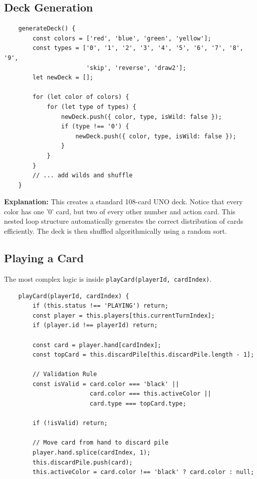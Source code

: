 \documentclass[11pt,a4paper]{article}
\begin{document}
\subsection{Deck Generation}
\begin{verbatim}
    generateDeck() {
        const colors = ['red', 'blue', 'green', 'yellow'];
        const types = ['0', '1', '2', '3', '4', '5', '6', '7', '8', '9', 
                       'skip', 'reverse', 'draw2'];
        let newDeck = [];
        
        for (let color of colors) {
            for (let type of types) {
                newDeck.push({ color, type, isWild: false });
                if (type !== '0') {
                    newDeck.push({ color, type, isWild: false });
                }
            }
        }
        // ... add wilds and shuffle
    }
\end{verbatim}

\textbf{Explanation:} 
This creates a standard 108-card UNO deck. Notice that every color has one '0' card, but two of every other number and action card. This nested loop structure automatically generates the correct distribution of cards efficiently. The deck is then shuffled algorithmically using a random sort.

\subsection{Playing a Card}
The most complex logic is inside \texttt{playCard(playerId, cardIndex)}.

\begin{verbatim}
    playCard(playerId, cardIndex) {
        if (this.status !== 'PLAYING') return;
        const player = this.players[this.currentTurnIndex];
        if (player.id !== playerId) return; 

        const card = player.hand[cardIndex];
        const topCard = this.discardPile[this.discardPile.length - 1];

        // Validation Rule
        const isValid = card.color === 'black' || 
                        card.color === this.activeColor || 
                        card.type === topCard.type;

        if (!isValid) return;

        // Move card from hand to discard pile
        player.hand.splice(cardIndex, 1);
        this.discardPile.push(card);
        this.activeColor = card.color !== 'black' ? card.color : null;
\end{verbatim}
\end{document}
